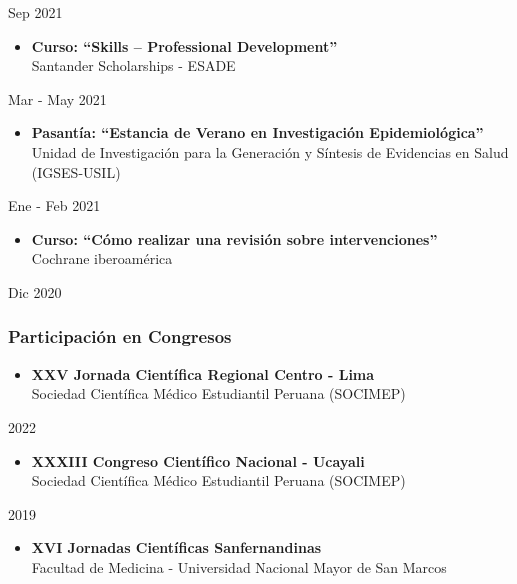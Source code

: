 \documentclass[
  letterpaper,
  DIV=11,
  numbers=noendperiod]{scrartcl}
\providecommand{\tightlist}{%
  \setlength{\itemsep}{0pt}\setlength{\parskip}{0pt}}\usepackage{longtable,booktabs,array}
\begin{document}
Sep 2021

\begin{itemize}
\tightlist
\item
  \textbf{Curso: ``Skills -- Professional Development''}\\
  Santander Scholarships - ESADE
\end{itemize}

Mar - May 2021

\begin{itemize}
\tightlist
\item
  \textbf{Pasantía: ``Estancia de Verano en Investigación
  Epidemiológica''}\\
  Unidad de Investigación para la Generación y Síntesis de Evidencias en
  Salud (IGSES-USIL)
\end{itemize}

Ene - Feb 2021

\begin{itemize}
\tightlist
\item
  \textbf{Curso: ``Cómo realizar una revisión sobre intervenciones''}\\
  Cochrane iberoamérica
\end{itemize}

Dic 2020

\hypertarget{participaciuxf3n-en-congresos}{%
\subsubsection{Participación en
Congresos}\label{participaciuxf3n-en-congresos}}

\begin{itemize}
\tightlist
\item
  \textbf{XXV Jornada Científica Regional Centro - Lima}\\
  Sociedad Científica Médico Estudiantil Peruana (SOCIMEP)
\end{itemize}

2022

\begin{itemize}
\tightlist
\item
  \textbf{XXXIII Congreso Científico Nacional - Ucayali}\\
  Sociedad Científica Médico Estudiantil Peruana (SOCIMEP)
\end{itemize}

2019

\begin{itemize}
\tightlist
\item
  \textbf{XVI Jornadas Científicas Sanfernandinas}\\
  Facultad de Medicina - Universidad Nacional Mayor de San Marcos
\end{itemize}
\end{document}
